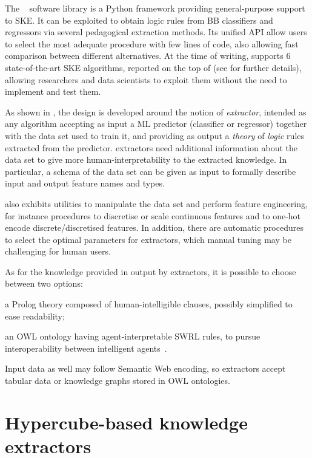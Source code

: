 \documentclass[
]{ceurart}
\begin{document}
The \psyke{}~\cite{psyke-woa2021,psyke-ia2022} software library is a Python framework providing general-purpose support to SKE.
%
It can be exploited to obtain logic rules from BB classifiers and regressors via several pedagogical extraction methods.
%
Its unified API allow users to select the most adequate procedure with few lines of code, also allowing fast comparison between different alternatives.
%
At the time of writing, \psyke{} supports 6 state-of-the-art SKE algorithms, reported on the top of  (see  for further details), allowing researchers and data scientists to exploit them without the need to implement and test them.

As shown in , the \psyke{} design is developed around the notion of \emph{extractor}, intended as any algorithm accepting as input a ML predictor (classifier or regressor) together with the data set used to train it, and providing as output a \emph{theory} of \emph{logic} rules extracted from the predictor.
%
\psyke{} extractors need additional information about the data set to give more human-interpretability to the extracted knowledge.
In particular, a schema of the data set can be given as input to formally describe input and output feature names and types.

\psyke{} also exhibits utilities to manipulate the data set and perform feature engineering, for instance procedures to discretise or scale continuous features and to one-hot encode discrete/discretised features.
%
In addition, there are automatic procedures to select the optimal parameters for extractors, which manual tuning may be challenging for human users.

As for the knowledge provided in output by extractors, it is possible to choose between two options:
\begin{inlinelist}
	\item a Prolog theory composed of human-intelligible clauses, possibly simplified to ease readability;
	\item an OWL ontology having agent-interpretable SWRL rules, to pursue interoperability between intelligent agents~\cite{psyke-extraamas2022}.
\end{inlinelist}
%
Input data as well may follow Semantic Web encoding, so \psyke{} extractors accept tabular data or knowledge graphs stored in OWL ontologies.

\section{Hypercube-based knowledge extractors}\label{sec:contribution}
\end{document}

